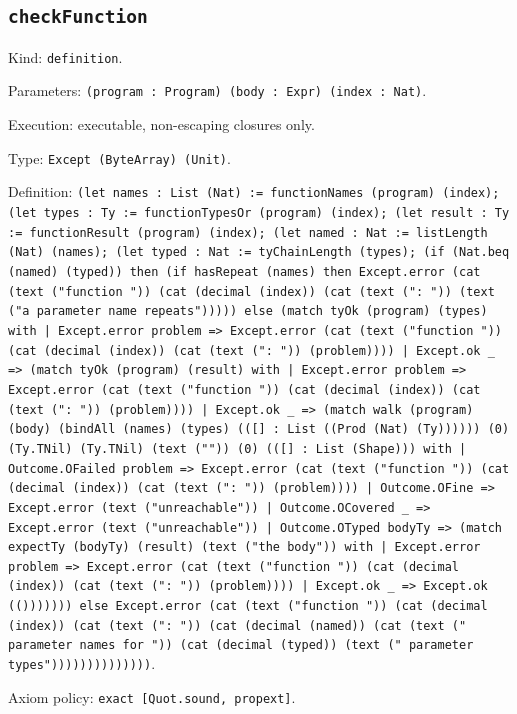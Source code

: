 \documentclass[11pt]{article}
\begin{document}
\subsection*{\texttt{checkFunction}}
\noindent Kind: \texttt{definition}.\par
\noindent Parameters: \texttt{(program : Program) (body : Expr) (index : Nat)}.\par
\noindent Execution: executable, non-escaping closures only.\par
\noindent Type: \texttt{Except (ByteArray) (Unit)}.\par
\noindent Definition: \texttt{(let names : List (Nat) := functionNames (program) (index); (let types : Ty := functionTypesOr (program) (index); (let result : Ty := functionResult (program) (index); (let named : Nat := listLength (Nat) (names); (let typed : Nat := tyChainLength (types); (if (Nat.beq (named) (typed)) then (if hasRepeat (names) then Except.error (cat (text ("function ")) (cat (decimal (index)) (cat (text (": ")) (text ("a parameter name repeats"))))) else (match tyOk (program) (types) with | Except.error problem => Except.error (cat (text ("function ")) (cat (decimal (index)) (cat (text (": ")) (problem)))) | Except.ok \_ => (match tyOk (program) (result) with | Except.error problem => Except.error (cat (text ("function ")) (cat (decimal (index)) (cat (text (": ")) (problem)))) | Except.ok \_ => (match walk (program) (body) (bindAll (names) (types) (([] : List ((Prod (Nat) (Ty)))))) (0) (Ty.TNil) (Ty.TNil) (text ("")) (0) (([] : List (Shape))) with | Outcome.OFailed problem => Except.error (cat (text ("function ")) (cat (decimal (index)) (cat (text (": ")) (problem)))) | Outcome.OFine => Except.error (text ("unreachable")) | Outcome.OCovered \_ => Except.error (text ("unreachable")) | Outcome.OTyped bodyTy => (match expectTy (bodyTy) (result) (text ("the body")) with | Except.error problem => Except.error (cat (text ("function ")) (cat (decimal (index)) (cat (text (": ")) (problem)))) | Except.ok \_ => Except.ok (())))))) else Except.error (cat (text ("function ")) (cat (decimal (index)) (cat (text (": ")) (cat (decimal (named)) (cat (text (" parameter names for ")) (cat (decimal (typed)) (text (" parameter types"))))))))))))))}.\par
\noindent Axiom policy: \texttt{exact [Quot.sound, propext]}.\par
\end{document}
